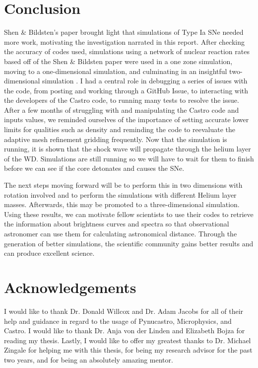 \documentclass[preprint]{aastex62}
\begin{document}
\newpage

\section{Conclusion}

  
  Shen \& Bildsten's paper brought light that simulations of Type Ia SNe needed more work, motivating the investigation narrated in this report. After checking the accuracy of codes used, simulations using a network of nuclear reaction rates based off of the Shen \& Bildsten paper were used in a one zone simulation, moving to a one-dimensional simulation, and culminating in an insightful two-dimensional simulation \citep{shenNbildsten}. I had a central role in debugging a series of issues with the code, from posting and working through a GitHub Issue, to interacting with the developers of the Castro code, to running many tests to resolve the issue. After a few months of struggling with and manipulating the Castro code and inputs values, we reminded ourselves of the importance of setting accurate lower limits for qualities such as density and reminding the code to reevaluate the adaptive mesh refinement gridding frequently. Now that the simulation is running, it is shown that the shock wave will propagate through the helium layer of the WD. Simulations are still running so we will have to wait for them to finish before we can see if the core detonates and causes the SNe. 
  
  The next steps moving forward will be to perform this in two dimensions with rotation involved and to perform the simulations with different Helium layer masses. Afterwards, this may be promoted to a three-dimensional simulation. Using these results, we can motivate fellow scientists to use their codes to retrieve the information about brightness curves and spectra so that observational astronomer can use them for calculating astronomical distance. Through the generation of better simulations, the scientific community gains better results and can produce excellent science. 

  
\section{Acknowledgements}

I would like to thank Dr. Donald Willcox and Dr. Adam Jacobs for all of their help and guidance in regard to the usage of Pynucastro, Microphysics, and Castro. I would like to thank Dr. Anja von der Linden and Elizabeth Bojza for reading my thesis. Lastly, I would like to offer my greatest thanks to Dr. Michael Zingale for helping me with this thesis, for being my research advisor for the past two years, and for being an absolutely amazing mentor. 


\end{document}

